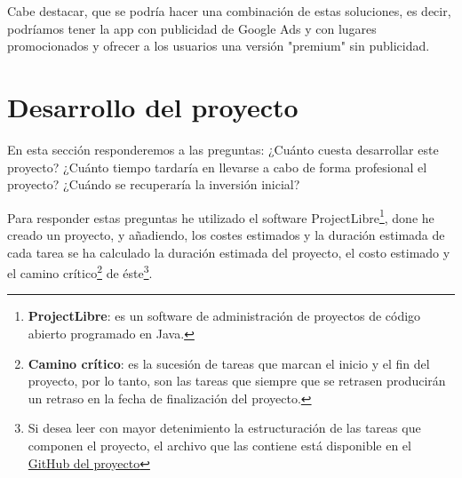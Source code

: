 \documentclass{report}
\begin{document}
Cabe destacar, que se podría hacer una combinación de estas soluciones, es decir, podríamos tener la app con publicidad de Google Ads y con lugares promocionados y ofrecer a los usuarios una versión "premium" sin publicidad.

\section{Desarrollo del proyecto}

En esta sección responderemos a las preguntas: ¿Cuánto cuesta desarrollar este proyecto? ¿Cuánto tiempo tardaría en llevarse a cabo de forma profesional el proyecto? ¿Cuándo se recuperaría la inversión inicial?

Para responder estas preguntas he utilizado el software ProjectLibre\footnote{\textbf{ProjectLibre}: es un software de administración de proyectos de código abierto programado en Java.}, done he creado un proyecto, y añadiendo, los costes estimados y la duración estimada de cada tarea se ha calculado la duración estimada del proyecto, el costo estimado y el camino crítico\footnote{\textbf{Camino crítico}: es la sucesión de tareas que marcan el inicio y el fin del proyecto, por lo tanto, son las tareas que siempre que se retrasen producirán un retraso en la fecha de finalización del proyecto.} de éste\footnote{Si desea leer con mayor detenimiento la estructuración de las tareas que componen el proyecto, el archivo que las contiene está disponible en el \href{https://github.com/AaronJoseCabreraMartin/TFG-DiscoverTenerife}{GitHub del proyecto}}.
\end{document}
